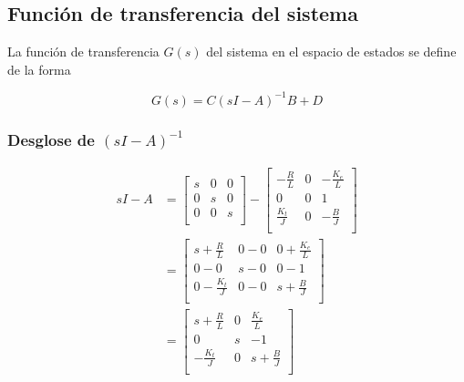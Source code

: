 
\subsection{Función de transferencia del sistema}
La función de transferencia $G(s)$ del sistema en el espacio de estados
se define de la forma

\begin{equation}
  G(s) = C(sI-A)^{-1}B + D
\end{equation}
 
\subsubsection{Desglose de $(sI-A)^{-1}$}

\begin{equation}
  \begin{aligned}
    sI-A &= \begin{bmatrix}
      s & 0 & 0 \\
      0 & s & 0 \\
      0 & 0 & s \\
    \end{bmatrix}
    - \begin{bmatrix}
      -\frac{R}{L}  & 0 &  -\frac{K_e}{L} \\
      0             & 0 &   1             \\
      \frac{K_t}{J} & 0 &  -\frac{B}{J}   \\
    \end{bmatrix}\\
    &= \begin{bmatrix}
      s+\frac{R}{L}    & 0-0 & 0+\frac{K_e}{L} \\
      0-0              & s-0 & 0-1             \\
      0-\frac{K_t}{J}  & 0-0 & s+\frac{B}{J}   \\
    \end{bmatrix}\\
    &= \begin{bmatrix}
      s+\frac{R}{L}  & 0 &  \frac{K_e}{L} \\
      0              & s & -1             \\
     -\frac{K_t}{J}  & 0 &  s+\frac{B}{J} \\
    \end{bmatrix}
  \end{aligned}
\end{equation}

